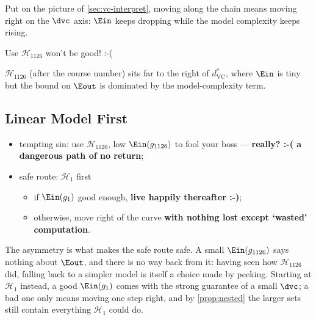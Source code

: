 Put on the picture of \autoref{sec:vc-interpret}, moving along the chain means
moving right on the \(\dvc\) axis: \(\Ein\) keeps dropping while the model
complexity keeps rising.

\begin{center}
    \vccurve
    \hspace{0.6cm}
    \begin{minipage}[c]{0.3\textwidth}
        \begin{moral}
            Use \(\mathcal{H}_{1126}\) won't be good! :-(
        \end{moral}
    \end{minipage}
\end{center}

\(\mathcal{H}_{1126}\) (after the course number) sits far to the right of
\(d_{\mathrm{VC}}^*\), where \(\Ein\) is tiny but the bound on \(\Eout\) is
dominated by the model-complexity term.

\subsection{Linear Model First}

\begin{center}
    \vccurve
\end{center}

\begin{itemize}
    \item tempting sin: use \(\mathcal{H}_{1126}\), low \(\Ein(g_{1126})\) to
        fool your boss --- \textbf{really? :-( a dangerous path of no return};
    \item safe route: \(\mathcal{H}_1\) first
        \begin{itemize}
            \item if \(\Ein(g_1)\) good enough, \textbf{live happily thereafter
                :-)};
            \item otherwise, move right of the curve \textbf{with nothing lost
                except `wasted' computation}.
        \end{itemize}
\end{itemize}

The asymmetry is what makes the safe route safe. A small \(\Ein(g_{1126})\)
says nothing about \(\Eout\), and there is no way back from it: having seen how
\(\mathcal{H}_{1126}\) did, falling back to a simpler model is itself a choice
made by peeking. Starting at \(\mathcal{H}_1\) instead, a good \(\Ein(g_1)\)
comes with the strong guarantee of a small \(\dvc\); a bad one only means
moving one step right, and by \autoref{prop:nested} the larger sets still
contain everything \(\mathcal{H}_1\) could do.

